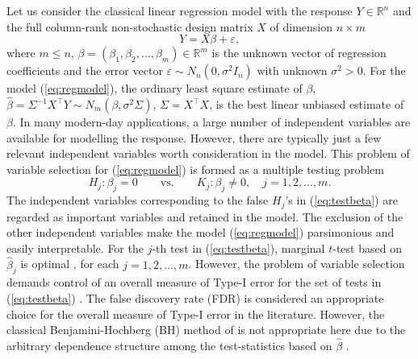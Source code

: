 \documentclass[11pt]{article}
\numberwithin{equation}{section}
\theoremstyle{plain}
\theoremstyle{remark}
\begin{document}
Let us consider the classical linear regression model with the response $Y\in \mathbb{R}^n$ and the full column-rank non-stochastic design matrix $X$ of dimension $n\times m$
\begin{equation}\label{eq:regmodel}
Y=X\beta+\varepsilon,
\end{equation}
where $m\leq n$, $\beta=(\beta_1, \beta_2, ..., \beta_m)\in \mathbb{R}^m$ is the unknown vector of regression coefficients and the error vector $\varepsilon\sim N_n(0,\sigma^2I_n)$ with unknown $\sigma^2>0$. For the model (\ref{eq:regmodel}), the ordinary least square estimate of $\beta$, $\hat{\beta}=\Sigma^{-1}X^\top Y\sim N_m(\beta,\sigma^2 \Sigma)$, $\Sigma=X^\top X$, is the best linear unbiased estimate of $\beta$. In many modern-day applications, a large number of independent variables are available for modelling the response. However, there are typically just a few relevant independent variables worth consideration in the model. This problem of variable selection for (\ref{eq:regmodel}) is formed as a multiple testing problem
\begin{equation}\label{eq:testbeta}
    H_j:\beta_j=0\qquad\textrm{vs.}\qquad K_j:\beta_j\neq 0,\quad j=1,2,...,m.
\end{equation}
The independent variables corresponding to the false $H_j$'s in (\ref{eq:testbeta}) are regarded as important variables and retained in the model. The exclusion of the other independent variables make the model (\ref{eq:regmodel}) parsimonious and easily interpretable. For the $j$-th test in (\ref{eq:testbeta}), marginal $t$-test based on $\hat{\beta}_j$ is optimal \citep{lehmann2005testing}, for each $j=1,2,...,m$. However, the problem of variable selection demands control of an overall measure of Type-I error for the set of tests in (\ref{eq:testbeta}) \citep{barber2015controlling}. The false discovery rate (FDR) \citep{benjamini1995controlling} is considered an appropriate choice for the overall measure of Type-I error in the literature. However, the classical Benjamini-Hochberg (BH) method of \citet{benjamini1995controlling} is not appropriate here due to the arbitrary dependence structure among the test-statistics based on $\hat{\beta}$ \citep{sarkar2022adjusting}. 
\end{document}
